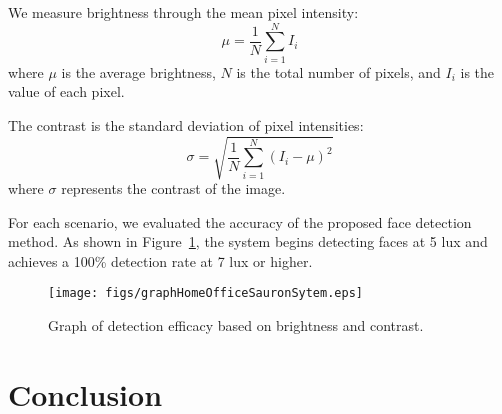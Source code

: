 \documentclass[english,hidelinks]{sbrt}
\begin{document}
We measure brightness through the mean pixel intensity: 
\begin{equation}
    \mu = \frac{1}{N} \sum_{i=1}^{N} I_i
\label{Eq. brightness}
\end{equation}
where $\mu$ is the average brightness, $N$ is the total number of pixels, and $I_i$ is the value of each pixel.

The contrast is the standard deviation of pixel intensities:
\begin{equation}
    \sigma = \sqrt{\frac{1}{N} \sum_{i=1}^{N} (I_i - \mu)^2}
    \label{eq.contrast}
\end{equation}
where $\sigma$ represents the contrast of the image.

For each scenario, we evaluated the accuracy of the proposed face detection method. As shown in Figure~\ref{fig: detection}, the system begins detecting faces at 5 lux and achieves a 100\% detection rate at 7 lux or higher.

\begin{figure}
    \centering
    \texttt{[image: figs/graphHomeOfficeSauronSytem.eps]}
    \caption{Graph of detection efficacy based on brightness and contrast.}
    \label{fig: detection}
\end{figure}

\section{Conclusion}
\label{sec: V}
\end{document}
